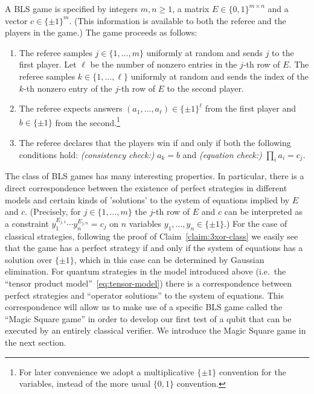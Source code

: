 \begin{definition}\label{def:bls-game}
A BLS game is specified by integers $m,n\geq 1$, a matrix $E\in \{0,1\}^{m\times n}$ and a vector $c\in\{\pm 1\}^m$. (This information is available to both the referee and the players in the game.) The game proceeds as follows:
\begin{enumerate}
\item The referee samples $j\in\{1,\ldots,m\}$ uniformly at random and sends $j$ to the first player. Let $\ell$ be the number of nonzero entries in the $j$-th row of $E$. The referee samples $k\in\{1,\ldots,\ell\}$ uniformly at random and sends the index of the $k$-th nonzero entry of the $j$-th row of $E$ to the second player. 
\item The referee expects answers $(a_1,\ldots,a_\ell)\in\{\pm 1\}^\ell$ from the first player and $b\in\{\pm 1\}$ from the second.\footnote{For later convenience we adopt a multiplicative $\{\pm 1\}$ convention for the variables, instead of the more usual $\{0,1\}$ convention.}
\item The referee declares that the players win if and only if both the following conditions hold: \emph{(consistency check:)} $a_k = b$ and \emph{(equation check:)} $\prod_{i} a_i = c_j$. 
\end{enumerate}
\end{definition}

The class of BLS games has many interesting properties. In particular, there is a  direct correspondence between the existence of perfect strategies in different models and certain kinds of 'solutions' to the system of equations implied by $E$ and $c$. (Precisely, for $j\in \{1,\ldots,m\}$ the $j$-th row of $E$ and $c$ can be interpreted as a constraint $y_1^{E_{j,1}} \cdots y_n^{E_{j,n}} = c_j$ on $n$ variables $y_1,\ldots,y_n \in \{\pm 1\}$.)
For the case of classical strategies, following the proof of Claim~\ref{claim:3xor-class} we easily see that the game has a perfect strategy if and only if the system of equations has a solution over $\{\pm 1\}$, which in this case can be determined by Gaussian elimination. For quantum strategies in the model introduced above (i.e.\ the ``tensor product model''~\eqref{eq:tensor-model}) there is a correspondence between perfect strategies and ``operator solutions'' to the system of equations. This correspondence will allow us to make use of a specific BLS game called the ``Magic Square game'' in order to develop our first test of a qubit that can be executed by an entirely classical verifier. We introduce the Magic Square game in the next section. 

